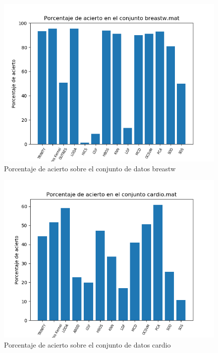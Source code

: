\begin{figure}[H]
	\centering
	\includegraphics[scale=0.7]{imagenes/imgs-exp1/accuracy/breastw}
	\caption{Porcentaje de acierto sobre el conjunto de datos breastw}
	\label{breastw_accuracy}
\end{figure}

\begin{figure}[H]
	\centering
	\includegraphics[scale=0.7]{imagenes/imgs-exp1/accuracy/cardio}
	\caption{Porcentaje de acierto sobre el conjunto de datos cardio}
	\label{cardio_accuracy}
\end{figure}

